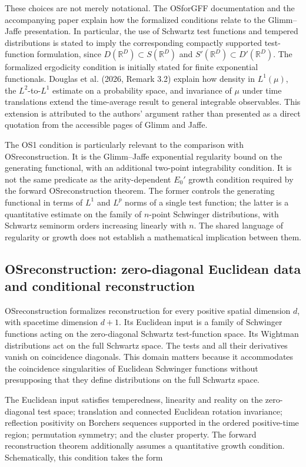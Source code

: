 \documentclass[pdflatex,sn-apa]{sn-jnl}
\begin{document}
These choices are not merely notational. The OSforGFF documentation and the accompanying paper explain how the formalized conditions relate to the Glimm--Jaffe presentation. In particular, the use of Schwartz test functions and tempered distributions is stated to imply the corresponding compactly supported test-function formulation, since \(D(\mathbb R^D)\subset S(\mathbb R^D)\) and \(S'(\mathbb R^D)\subset D'(\mathbb R^D)\). The formalized ergodicity condition is initially stated for finite exponential functionals. Douglas et al. (2026, Remark 3.2) explain how density in \(L^1(\mu)\), the \(L^2\)-to-\(L^1\) estimate on a probability space, and invariance of \(\mu\) under time translations extend the time-average result to general integrable observables. This extension is attributed to the authors' argument rather than presented as a direct quotation from the accessible pages of Glimm and Jaffe.

The OS1 condition is particularly relevant to the comparison with OSreconstruction. It is the Glimm--Jaffe exponential regularity bound on the generating functional, with an additional two-point integrability condition. It is not the same predicate as the arity-dependent \(E_0'\) growth condition required by the forward OSreconstruction theorem. The former controls the generating functional in terms of \(L^1\) and \(L^p\) norms of a single test function; the latter is a quantitative estimate on the family of \(n\)-point Schwinger distributions, with Schwartz seminorm orders increasing linearly with \(n\). The shared language of regularity or growth does not establish a mathematical implication between them.

\subsection{OSreconstruction: zero-diagonal Euclidean data and conditional reconstruction}

OSreconstruction formalizes reconstruction for every positive spatial dimension \(d\), with spacetime dimension \(d+1\). Its Euclidean input is a family of Schwinger functions acting on the zero-diagonal Schwartz test-function space. Its Wightman distributions act on the full Schwartz space. The tests and all their derivatives vanish on coincidence diagonals. This domain matters because it accommodates the coincidence singularities of Euclidean Schwinger functions without presupposing that they define distributions on the full Schwartz space.

The Euclidean input satisfies temperedness, linearity and reality on the zero-diagonal test space; translation and connected Euclidean rotation invariance; reflection positivity on Borchers sequences supported in the ordered positive-time region; permutation symmetry; and the cluster property. The forward reconstruction theorem additionally assumes a quantitative growth condition. Schematically, this condition takes the form
\end{document}
